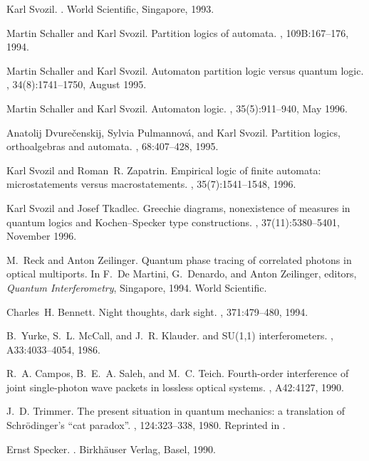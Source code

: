 \documentclass [11pt]{llncs}
\begin{document}
\begin{thebibliography}{10}
Karl Svozil.
.
\newblock World Scientific, Singapore, 1993.

Martin Schaller and Karl Svozil.
\newblock Partition logics of automata.
, 109B:167--176, 1994.

Martin Schaller and Karl Svozil.
\newblock Automaton partition logic versus quantum logic.
, 34(8):1741--1750,
  August 1995.

Martin Schaller and Karl Svozil.
\newblock Automaton logic.
, 35(5):911--940,
  May 1996.

Anatolij Dvure{\v{c}}enskij, Sylvia Pulmannov{\'{a}}, and Karl Svozil.
\newblock Partition logics, orthoalgebras and automata.
, 68:407--428, 1995.

Karl Svozil and Roman~R. Zapatrin.
\newblock Empirical logic of finite automata: microstatements versus
  macrostatements.
, 35(7):1541--1548,
  1996.

Karl Svozil and Josef Tkadlec.
\newblock Greechie diagrams, nonexistence of measures in quantum logics and
  {K}ochen--{S}pecker type constructions.
, 37(11):5380--5401, November
  1996.

M.~Reck and Anton Zeilinger.
\newblock Quantum phase tracing of correlated photons in optical multiports.
\newblock In F.~De Martini, G.~Denardo, and Anton Zeilinger, editors, {\em
  Quantum Interferometry}, Singapore, 1994. World Scientific.

Charles~H. Bennett.
\newblock Night thoughts, dark sight.
, 371:479--480, 1994.

B.~Yurke, S.~L. McCall, and J.~R. Klauder.
 and {SU(1,1)} interferometers.
, A33:4033--4054, 1986.

R.~A. Campos, B.~E.~A. Saleh, and M.~C. Teich.
\newblock Fourth-order interference of joint single-photon wave packets in
  lossless optical systems.
, A42:4127, 1990.

J.~D. Trimmer.
\newblock The present situation in quantum mechanics: a translation of
  {S}chr{\"{o}}dinger's ``cat paradox''.
, 124:323--338, 1980.
\newblock Reprinted in \cite[pp. 152-167]{wheeler-Zurek:83}.

Ernst Specker.
.
\newblock Birkh{\"{a}}user Verlag, Basel, 1990.

\end{thebibliography}
\end{document}
